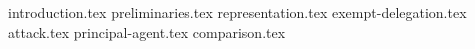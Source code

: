 {introduction.tex}
{preliminaries.tex}
{representation.tex}
{exempt-delegation.tex}
{attack.tex}
{principal-agent.tex}
{comparison.tex}

